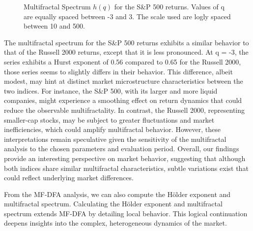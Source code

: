 \documentclass[11pt]{extarticle}
\begin{document}
\begin{figure}[htbp]
    \centering
    \caption{Multifractal Spectrum $h(q)$ for the S\&P 500 returns. Values of q are equally spaced between -3 and 3.
    The scale used are logly spaced between 10 and 500.}
\end{figure}

\FloatBarrier

The multifractal spectrum for the S\&P 500 returns exhibits a similar behavior to that of the Russell 2000 returns,
except that it is less pronounced. At q = -3, the series exhibits a Hurst exponent of 0.56 compared to 0.65 for the
Russell 2000, those series seems to slightly differs in their behavior.
This difference, albeit modest, may hint at distinct market microstructure characteristics between the two indices.
For instance, the S\&P 500, with its larger and more liquid companies, might experience a smoothing effect on return
dynamics that could reduce the observable multifractality. In contrast, the Russell 2000, representing smaller-cap
stocks, may be subject to greater fluctuations and market inefficiencies, which could amplify multifractal behavior.
However, these interpretations remain speculative given the sensitivity of the multifractal analysis to the chosen
parameters and evaluation period.
Overall, our findings provide an interesting perspective on market behavior, suggesting that although both indices
share similar multifractal characteristics, subtle variations exist that could reflect underlying market differences.

From the MF-DFA analysis, we can also compute the Hölder exponent and multifractal spectrum.
Calculating the Hölder exponent and multifractal spectrum extends MF-DFA by detailing local behavior.
This logical continuation deepens insights into the complex, heterogeneous dynamics of the market.
\end{document}

